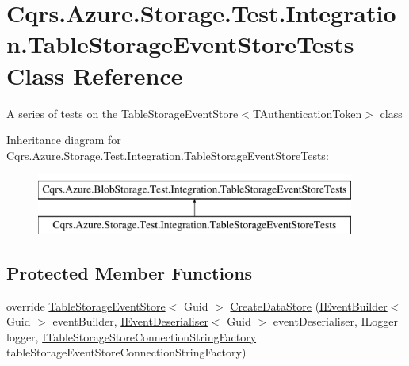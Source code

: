 \hypertarget{classCqrs_1_1Azure_1_1Storage_1_1Test_1_1Integration_1_1TableStorageEventStoreTests}{}\section{Cqrs.\+Azure.\+Storage.\+Test.\+Integration.\+Table\+Storage\+Event\+Store\+Tests Class Reference}
\label{classCqrs_1_1Azure_1_1Storage_1_1Test_1_1Integration_1_1TableStorageEventStoreTests}


A series of tests on the Table\+Storage\+Event\+Store$<$\+T\+Authentication\+Token$>$ class  


Inheritance diagram for Cqrs.\+Azure.\+Storage.\+Test.\+Integration.\+Table\+Storage\+Event\+Store\+Tests\+:\begin{figure}[H]
\begin{center}
\leavevmode
\includegraphics[height=2.000000cm]{classCqrs_1_1Azure_1_1Storage_1_1Test_1_1Integration_1_1TableStorageEventStoreTests}
\end{center}
\end{figure}
\subsection*{Protected Member Functions}
\begin{DoxyCompactItemize}
\item 
override \hyperlink{classCqrs_1_1Azure_1_1BlobStorage_1_1Events_1_1TableStorageEventStore}{Table\+Storage\+Event\+Store}$<$ Guid $>$ \hyperlink{classCqrs_1_1Azure_1_1Storage_1_1Test_1_1Integration_1_1TableStorageEventStoreTests_a4e143d134a156e2ab0d044d7f6f15b5d}{Create\+Data\+Store} (\hyperlink{interfaceCqrs_1_1Events_1_1IEventBuilder}{I\+Event\+Builder}$<$ Guid $>$ event\+Builder, \hyperlink{interfaceCqrs_1_1Events_1_1IEventDeserialiser}{I\+Event\+Deserialiser}$<$ Guid $>$ event\+Deserialiser, I\+Logger logger, \hyperlink{interfaceCqrs_1_1Azure_1_1BlobStorage_1_1ITableStorageStoreConnectionStringFactory}{I\+Table\+Storage\+Store\+Connection\+String\+Factory} table\+Storage\+Event\+Store\+Connection\+String\+Factory)
\end{DoxyCompactItemize}
